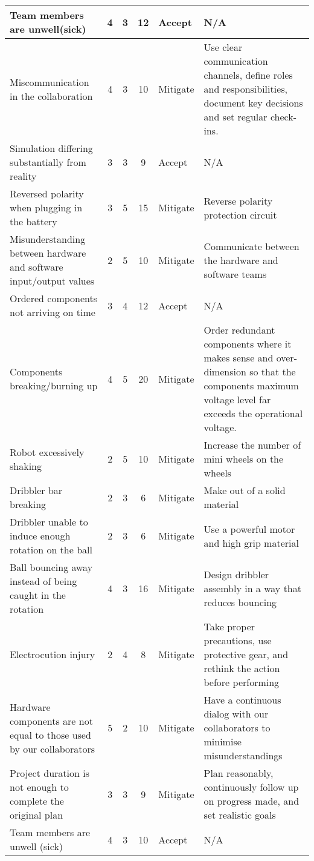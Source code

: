 \begin{table}[H]
\begin{tabularx}{\textwidth}{|X|c|c|c|X|X|}
         Team members are unwell(sick) & 4 & 3  & 12 & Accept & N/A \\ \hline
         Miscommunication in the collaboration & 4 & 3 & 10 & Mitigate  & Use clear communication channels, define roles and responsibilities, document key decisions and set regular check-ins. \\ \hline
         Simulation differing substantially from reality & 3 & 3 & 9 & Accept & N/A \\ \hline
         Reversed polarity when plugging in the battery & 3 & 5 & 15 & Mitigate & Reverse polarity protection circuit \\ \hline
         Misunderstanding between hardware and software input/output values & 2 & 5 & 10 & Mitigate & Communicate between the hardware and software teams \\ \hline
         Ordered components not arriving on time & 3 & 4 & 12 & Accept & N/A \\ \hline
         Components breaking/burning up & 4 & 5 & 20 & Mitigate & Order redundant components where it makes sense and over-dimension so that the components maximum voltage level far exceeds the operational voltage. \\ \hline
         Robot excessively shaking & 2 & 5 & 10 & Mitigate & Increase the number of mini wheels on the wheels \\ \hline
         Dribbler bar breaking & 2 & 3 & 6 & Mitigate & Make out of a solid material \\ \hline
         Dribbler unable to induce enough rotation on the ball & 2 & 3 & 6 & Mitigate & Use a powerful motor and high grip material \\ \hline
         Ball bouncing away instead of being caught in the rotation & 4 & 3 & 16 & Mitigate & Design dribbler assembly in a way that reduces bouncing \\ \hline
         Electrocution injury & 2 & 4 & 8 & Mitigate & Take proper precautions, use protective gear, and rethink the action before performing \\ \hline
         Hardware components are not equal to those used by our collaborators & 5 & 2 & 10 & Mitigate & Have a continuous dialog with our collaborators to minimise misunderstandings \\ \hline
         Project duration is not enough to complete the original plan & 3 & 3 & 9 & Mitigate & Plan reasonably, continuously follow up on progress made, and set realistic goals \\ \hline
         Team members are unwell (sick) & 4 & 3 & 10 & Accept & N/A \\ \hline

\end{tabularx}
\end{table}

